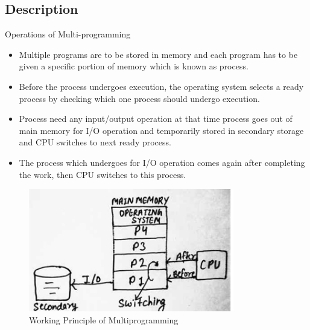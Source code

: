 \documentclass{beamer}
\begin{document}
\subsection{Description}
{

\begin{frame}{Operations of Multi-programming}
	
	
	\begin{minipage}{8 cm}
	\begin{itemize}
	    \item Multiple programs are to be stored in memory and each program has to be given a specific portion of memory which is known as process.
            \item Before the process undergoes execution, the operating system selects a ready process by checking which one process should undergo execution.
            \item Process need any input/output operation at that time process goes out of main memory for I/O operation and temporarily stored in secondary storage and CPU switches to next ready process.
            \item The process which undergoes for I/O operation comes again after completing the work, then CPU switches to this process.
	\end{itemize}
	
	\end{minipage}
	\hfill
	\begin{minipage}{5 cm}
	\begin{figure}
	\includegraphics[width=0.8\textwidth , height=0.3\textheight]{Picture2}
	\caption{Working Principle of Multiprogramming}
	\end{figure}

	\end{minipage}
		
	\end{frame}
}
\end{document}
